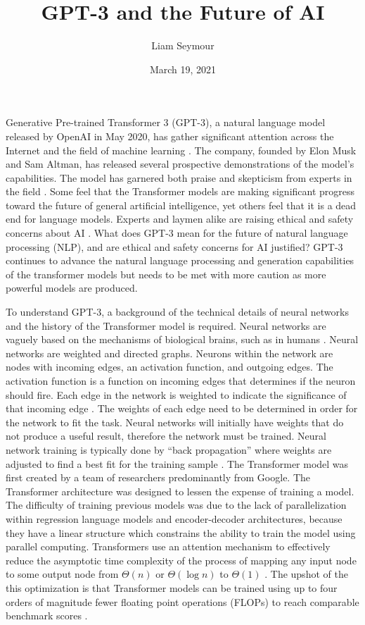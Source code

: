 \documentclass[12pt]{article}
\begin{document}
\title{GPT-3 and the Future of AI}
\author{Liam Seymour}
\date{March 19, 2021}
\maketitle

Generative Pre-trained Transformer 3 (GPT-3), a natural language model released
by OpenAI in May 2020, has gather significant attention across the Internet and
the field of machine learning \cite{simonite20}. The company, founded by Elon
Musk and Sam Altman, has released several prospective demonstrations of the
model's capabilities. The model has garnered both praise and skepticism from
experts in the field \cite{marcus20}. Some feel that the Transformer models are
making significant progress toward the future of general artificial
intelligence, yet others feel that it is a dead end for language models.
Experts and laymen alike are raising ethical and safety concerns about AI
\cite{cuthbertson20} \cite{rawlinson15} \cite{jones14} \cite{openletter}. What
does GPT-3 mean for the future of natural language processing (NLP), and are
ethical and safety concerns for AI justified? GPT-3 continues to advance the
natural language processing and generation capabilities of the transformer
models but needs to be met with more caution as more powerful models are
produced. 

To understand GPT-3, a background of the technical details of neural networks
and the history of the Transformer model is required. Neural networks are
vaguely based on the mechanisms of biological brains, such as in humans
\cite{winston92}. Neural networks are weighted and directed graphs. Neurons
within the network are nodes with incoming edges, an activation function, and
outgoing edges. The activation function is a function on incoming edges that
determines if the neuron should fire. Each edge in the network is weighted to
indicate the significance of that incoming edge \cite{winston92}. The weights
of each edge need to be determined in order for the network to fit the task.
Neural networks will initially have weights that do not produce a useful
result, therefore the network must be trained. Neural network training is
typically done by ``back propagation'' where weights are adjusted to find a
best fit for the training sample \cite{winston92}.  The Transformer model was
first created by a team of researchers predominantly from Google. The
Transformer architecture was designed to lessen the expense of training a
model. The difficulty of training previous models was due to the lack of
parallelization within regression language models and encoder-decoder
architectures, because they have a linear structure which constrains the
ability to train the model using parallel computing.  Transformers use an
attention mechanism to effectively reduce the asymptotic time complexity of the
process of mapping any input node to some output node from $\Theta(n)$ or
$\Theta(\log n)$ to $\Theta(1)$ \cite{ashish17}. The upshot of the this
optimization is that Transformer models can be trained using up to four orders
of magnitude fewer floating point operations (FLOPs) to reach comparable
benchmark scores \cite{ashish17}.
\end{document}
